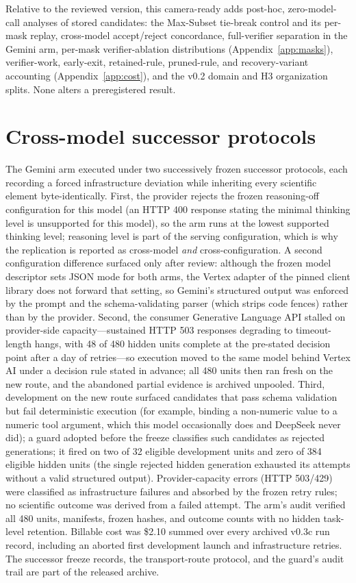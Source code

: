 \documentclass{article}
\begin{document}
Relative to the reviewed version, this camera-ready adds post-hoc, zero-model-call analyses of stored candidates: the Max-Subset tie-break control and its per-mask replay, cross-model accept/reject concordance, full-verifier separation in the Gemini arm, per-mask verifier-ablation distributions (Appendix~\ref{app:masks}), verifier-work, early-exit, retained-rule, pruned-rule, and recovery-variant accounting (Appendix~\ref{app:cost}), and the v0.2 domain and H3 organization splits. None alters a preregistered result.

\section{Cross-model successor protocols}
\label{app:successors}

The Gemini arm executed under two successively frozen successor protocols, each recording a forced infrastructure deviation while inheriting every scientific element byte-identically. First, the provider rejects the frozen reasoning-off configuration for this model (an HTTP 400 response stating the minimal thinking level is unsupported for this model), so the arm runs at the lowest supported thinking level; reasoning level is part of the serving configuration, which is why the replication is reported as cross-model \emph{and} cross-configuration. A second configuration difference surfaced only after review: although the frozen model descriptor sets JSON mode for both arms, the Vertex adapter of the pinned client library does not forward that setting, so Gemini's structured output was enforced by the prompt and the schema-validating parser (which strips code fences) rather than by the provider. Second, the consumer Generative Language API stalled on provider-side capacity---sustained HTTP 503 responses degrading to timeout-length hangs, with 48 of 480 hidden units complete at the pre-stated decision point after a day of retries---so execution moved to the same model behind Vertex AI under a decision rule stated in advance; all 480 units then ran fresh on the new route, and the abandoned partial evidence is archived unpooled. Third, development on the new route surfaced candidates that pass schema validation but fail deterministic execution (for example, binding a non-numeric value to a numeric tool argument, which this model occasionally does and DeepSeek never did); a guard adopted before the freeze classifies such candidates as rejected generations; it fired on two of 32 eligible development units and zero of 384 eligible hidden units (the single rejected hidden generation exhausted its attempts without a valid structured output). Provider-capacity errors (HTTP 503/429) were classified as infrastructure failures and absorbed by the frozen retry rules; no scientific outcome was derived from a failed attempt. The arm's audit verified all 480 units, manifests, frozen hashes, and outcome counts with no hidden task-level retention. Billable cost was \$2.10 summed over every archived v0.3c run record, including an aborted first development launch and infrastructure retries. The successor freeze records, the transport-route protocol, and the guard's audit trail are part of the released archive.
\end{document}

